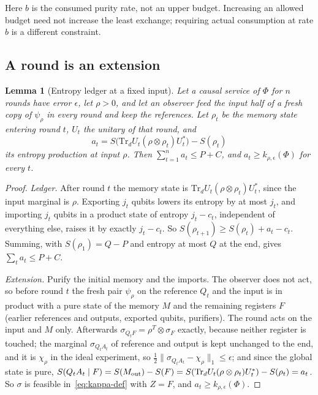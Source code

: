 \documentclass[11pt,a4paper]{article}
\theoremstyle{plain}
\newtheorem{lemma}[theorem]{Lemma}
\theoremstyle{definition}
\theoremstyle{remark}
\begin{document}
Here $b$ is the consumed purity rate, not an upper budget. Increasing an allowed budget need not increase the least exchange;
requiring actual consumption at rate $b$ is a different constraint.


\subsection{A round is an extension}

\begin{lemma}[Entropy ledger at a fixed input]\label{lem:round-extension}
Let a causal service of $\Phi$ for $n$ rounds have error $\epsilon$, let $\rho>0$, and let an observer feed the input half of a fresh copy of
$\psi_\rho$ in every round and keep the references. Let $\rho_t$ be the memory state entering round $t$, $U_t$ the unitary of that round, and
\[
a_t=S\big(\mathrm{Tr}_dU_t(\rho\otimes\rho_t)U_t^*\big)-S(\rho_t)
\]
its entropy production at input $\rho$. Then $\sum_{t=1}^na_t\le P+C$, and $a_t\ge k_{\rho,\epsilon}(\Phi)$ for every $t$.
\end{lemma}

\begin{proof}
\emph{Ledger.} After round $t$ the memory state is $\mathrm{Tr}_dU_t(\rho\otimes\rho_t)U_t^*$, since the input marginal is $\rho$. Exporting $j_t$ qubits lowers
its entropy by at most $j_t$, and importing $j_t$ qubits in a product state of entropy $j_t-c_t$, independent of everything else, raises it by
exactly $j_t-c_t$. So $S(\rho_{t+1})\ge S(\rho_t)+a_t-c_t$. Summing, with $S(\rho_1)=Q-P$ and entropy at most $Q$ at the end, gives
$\sum_ta_t\le P+C$.

\emph{Extension.} Purify the initial memory and the imports. The observer does not act, so before round $t$ the fresh pair $\psi_\rho$ on the
reference $Q_t$ and the input is in product with a pure state of the memory $M$ and the remaining registers $F$ (earlier references and outputs,
exported qubits, purifiers). The round acts on the input and $M$ only. Afterwards $\sigma_{Q_tF}=\rho^T\otimes\sigma_F$ exactly, because neither
register is touched; the marginal $\sigma_{Q_tA_t}$ of reference and output is kept unchanged to the end, and it is $\chi_\rho$ in the ideal
experiment, so $\frac12\|\sigma_{Q_tA_t}-\chi_\rho\|_1\le\epsilon$; and since the global state is pure,
$S(Q_tA_t\mid F)=S(M_{\rm out})-S(F)=S(\mathrm{Tr}_dU_t(\rho\otimes\rho_t)U_t^*)-S(\rho_t)=a_t$. So $\sigma$ is feasible in~\eqref{eq:kappa-def}
with $Z=F$, and $a_t\ge k_{\rho,\epsilon}(\Phi)$.
\end{proof}
\end{document}
